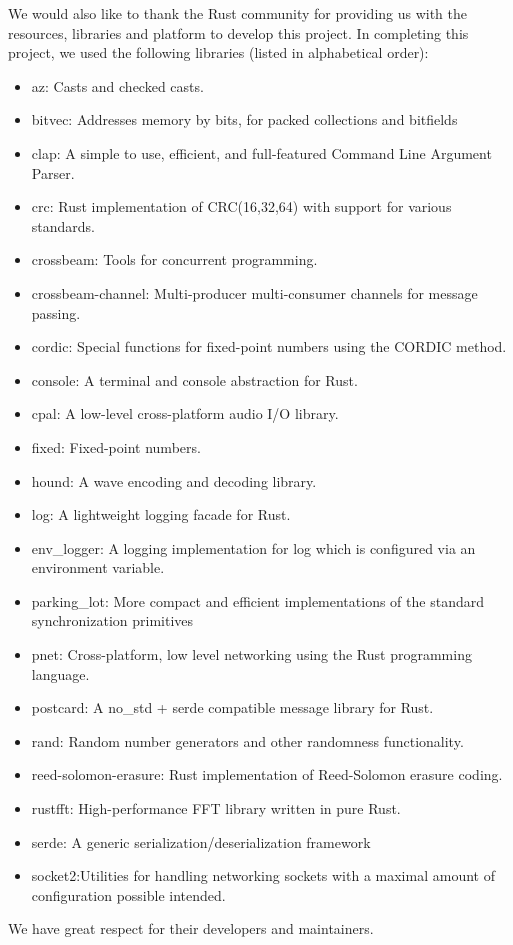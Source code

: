 \documentclass[10pt]{article}
\begin{document}
We would also like to thank the Rust community for providing us with the resources, libraries and platform to develop this project. In completing this project, we used the following libraries (listed in alphabetical order):
\begin{itemize}
  \item az: Casts and checked casts.
  \item bitvec: Addresses memory by bits, for packed collections and bitfields
  \item clap: A simple to use, efficient, and full-featured Command Line Argument Parser.
  \item crc: Rust implementation of CRC(16,32,64) with support for various standards.
  \item crossbeam: Tools for concurrent programming.
  \item crossbeam-channel: Multi-producer multi-consumer channels for message passing.
  \item cordic: Special functions for fixed-point numbers using the CORDIC method.
  \item console: A terminal and console abstraction for Rust.
  \item cpal: A low-level cross-platform audio I/O library.
  \item fixed: Fixed-point numbers.
  \item hound: A wave encoding and decoding library.
  \item log: A lightweight logging facade for Rust.
  \item env\_logger: A logging implementation for log which is configured via an environment variable.
  \item parking\_lot: More compact and efficient implementations of the standard synchronization primitives
  \item pnet: Cross-platform, low level networking using the Rust programming language.
  \item postcard: A no\_std + serde compatible message library for Rust.
  \item rand: Random number generators and other randomness functionality.
  \item reed-solomon-erasure: Rust implementation of Reed-Solomon erasure coding.
  \item rustfft: High-performance FFT library written in pure Rust.
  \item serde: A generic serialization/deserialization framework
  \item socket2:Utilities for handling networking sockets with a maximal amount of configuration possible intended.
\end{itemize}
We have great respect for their developers and maintainers.
% 
\end{document}
